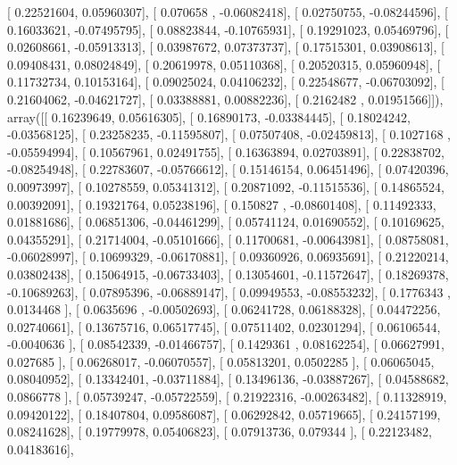 \documentclass{article}
\begin{document}
       [ 0.22521604,  0.05960307],
       [ 0.070658  , -0.06082418],
       [ 0.02750755, -0.08244596],
       [ 0.16033621, -0.07495795],
       [ 0.08823844, -0.10765931],
       [ 0.19291023,  0.05469796],
       [ 0.02608661, -0.05913313],
       [ 0.03987672,  0.07373737],
       [ 0.17515301,  0.03908613],
       [ 0.09408431,  0.08024849],
       [ 0.20619978,  0.05110368],
       [ 0.20520315,  0.05960948],
       [ 0.11732734,  0.10153164],
       [ 0.09025024,  0.04106232],
       [ 0.22548677, -0.06703092],
       [ 0.21604062, -0.04621727],
       [ 0.03388881,  0.00882236],
       [ 0.2162482 ,  0.01951566]]), array([[ 0.16239649,  0.05616305],
       [ 0.16890173, -0.03384445],
       [ 0.18024242, -0.03568125],
       [ 0.23258235, -0.11595807],
       [ 0.07507408, -0.02459813],
       [ 0.1027168 , -0.05594994],
       [ 0.10567961,  0.02491755],
       [ 0.16363894,  0.02703891],
       [ 0.22838702, -0.08254948],
       [ 0.22783607, -0.05766612],
       [ 0.15146154,  0.06451496],
       [ 0.07420396,  0.00973997],
       [ 0.10278559,  0.05341312],
       [ 0.20871092, -0.11515536],
       [ 0.14865524,  0.00392091],
       [ 0.19321764,  0.05238196],
       [ 0.150827  , -0.08601408],
       [ 0.11492333,  0.01881686],
       [ 0.06851306, -0.04461299],
       [ 0.05741124,  0.01690552],
       [ 0.10169625,  0.04355291],
       [ 0.21714004, -0.05101666],
       [ 0.11700681, -0.00643981],
       [ 0.08758081, -0.06028997],
       [ 0.10699329, -0.06170881],
       [ 0.09360926,  0.06935691],
       [ 0.21220214,  0.03802438],
       [ 0.15064915, -0.06733403],
       [ 0.13054601, -0.11572647],
       [ 0.18269378, -0.10689263],
       [ 0.07895396, -0.06889147],
       [ 0.09949553, -0.08553232],
       [ 0.1776343 ,  0.0134468 ],
       [ 0.0635696 , -0.00502693],
       [ 0.06241728,  0.06188328],
       [ 0.04472256,  0.02740661],
       [ 0.13675716,  0.06517745],
       [ 0.07511402,  0.02301294],
       [ 0.06106544, -0.0040636 ],
       [ 0.08542339, -0.01466757],
       [ 0.1429361 ,  0.08162254],
       [ 0.06627991,  0.027685  ],
       [ 0.06268017, -0.06070557],
       [ 0.05813201,  0.0502285 ],
       [ 0.06065045,  0.08040952],
       [ 0.13342401, -0.03711884],
       [ 0.13496136, -0.03887267],
       [ 0.04588682,  0.0866778 ],
       [ 0.05739247, -0.05722559],
       [ 0.21922316, -0.00263482],
       [ 0.11328919,  0.09420122],
       [ 0.18407804,  0.09586087],
       [ 0.06292842,  0.05719665],
       [ 0.24157199,  0.08241628],
       [ 0.19779978,  0.05406823],
       [ 0.07913736,  0.079344  ],
       [ 0.22123482,  0.04183616],
\end{document}

